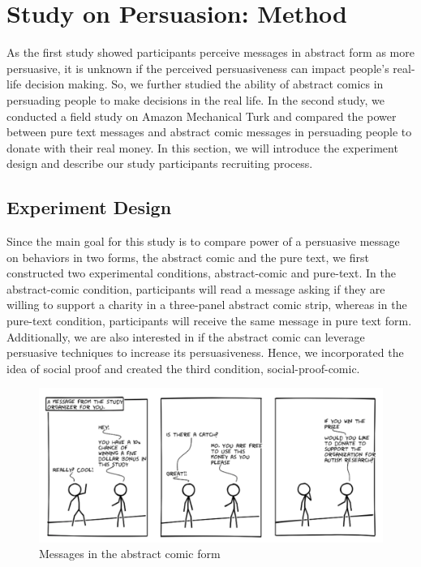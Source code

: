 \section{Study on Persuasion: Method}
\label{sec:Method2}

As the first study showed participants perceive messages in abstract form as more persuasive, it is unknown if the perceived persuasiveness can impact people's real-life decision making. So, we further studied the ability of abstract comics in persuading people to make decisions in the real life. In the second study, we conducted a field study on Amazon Mechanical Turk and compared the power between pure text messages and abstract comic messages in persuading people to donate with their real money. In this section, we will introduce the experiment design and describe our study participants recruiting process.

\subsection{Experiment Design}
Since the main goal for this study is to compare power of a persuasive message on behaviors in two forms, the abstract comic and the pure text, we first constructed two experimental conditions, abstract-comic and pure-text. In the abstract-comic condition, participants will read a message asking if they are willing to support a charity in a three-panel abstract comic strip, whereas in the pure-text condition, participants will receive the same message in pure text form. Additionally, we are also interested in if the abstract comic can leverage persuasive techniques to increase its persuasiveness. Hence, we incorporated the idea of social proof and created the third condition, social-proof-comic.

\begin{figure}[bt]
	\centering
	\includegraphics[width=\columnwidth]{./figures/abstract_comic.png}
	\caption{Messages in the abstract comic form}
	\label{fig:basic three comic panel}
\end{figure}

